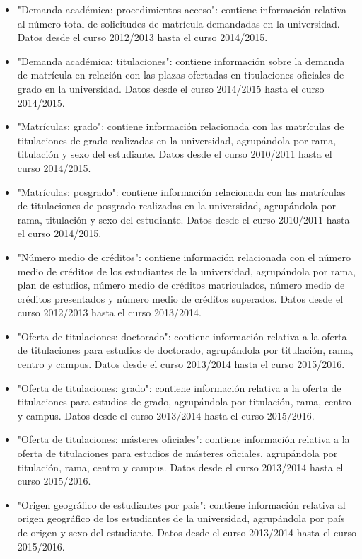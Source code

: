 \begin{itemize}
	\item "Demanda académica: procedimientos acceso": contiene información relativa al número total de solicitudes de matrícula demandadas en la universidad. Datos desde el curso 2012/2013 hasta el curso 2014/2015.
	\item "Demanda académica: titulaciones": contiene información sobre la demanda de matrícula en relación con las plazas ofertadas en titulaciones oficiales de grado en la universidad. Datos desde el curso 2014/2015 hasta el curso 2014/2015.
	\item "Matrículas: grado": contiene información relacionada con las matrículas de titulaciones de grado realizadas en la universidad, agrupándola por rama, titulación y sexo del estudiante. Datos desde el curso 2010/2011 hasta el curso 2014/2015.
	\item "Matrículas: posgrado": contiene información relacionada con las matrículas de titulaciones de posgrado realizadas en la universidad, agrupándola por rama, titulación y sexo del estudiante. Datos desde el curso 2010/2011 hasta el curso 2014/2015.
	\item "Número medio de créditos": contiene información relacionada con el número medio de créditos de los estudiantes de la universidad, agrupándola por rama, plan de estudios, número medio de créditos matriculados, número medio de créditos presentados y número medio de créditos superados. Datos desde el curso 2012/2013 hasta el curso 2013/2014.
	\item "Oferta de titulaciones: doctorado": contiene información relativa a la oferta de titulaciones para estudios de doctorado, agrupándola por titulación, rama, centro y campus. Datos desde el curso 2013/2014 hasta el curso 2015/2016.
	\item "Oferta de titulaciones: grado": contiene información relativa a la oferta de titulaciones para estudios de grado, agrupándola por titulación, rama, centro y campus. Datos desde el curso 2013/2014 hasta el curso 2015/2016.
	\item "Oferta de titulaciones: másteres oficiales": contiene información relativa a la oferta de titulaciones para estudios de másteres oficiales, agrupándola por titulación, rama, centro y campus. Datos desde el curso 2013/2014 hasta el curso 2015/2016.
	\item "Origen geográfico de estudiantes por país": contiene información relativa al origen geográfico de los estudiantes de la universidad, agrupándola por país de origen y sexo del estudiante. Datos desde el curso 2013/2014 hasta el curso 2015/2016.

\end{itemize}

